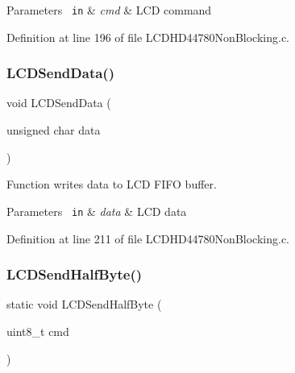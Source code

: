\begin{DoxyParams}[1]{Parameters}
\mbox{\texttt{ in}}  & {\em cmd} & L\+CD command \\
\hline
\end{DoxyParams}


Definition at line 196 of file L\+C\+D\+H\+D44780\+Non\+Blocking.\+c.

\mbox{\label{group___l_c_d_h_d44780_non_blocking_gacbe0b84f31cf18df2b70d509e826db3e_gacbe0b84f31cf18df2b70d509e826db3e}} 
\subsubsection{\texorpdfstring{LCDSendData()}{LCDSendData()}}
{\footnotesize\ttfamily void L\+C\+D\+Send\+Data (\begin{DoxyParamCaption}\item[{unsigned char}]{data }\end{DoxyParamCaption})}



Function writes data to L\+CD F\+I\+FO buffer. 


\begin{DoxyParams}[1]{Parameters}
\mbox{\texttt{ in}}  & {\em data} & L\+CD data \\
\hline
\end{DoxyParams}


Definition at line 211 of file L\+C\+D\+H\+D44780\+Non\+Blocking.\+c.

\mbox{\label{group___l_c_d_h_d44780_non_blocking_gaa62a47eb454afaa0aee3359692855962_gaa62a47eb454afaa0aee3359692855962}} 
\subsubsection{\texorpdfstring{LCDSendHalfByte()}{LCDSendHalfByte()}}
{\footnotesize\ttfamily static void L\+C\+D\+Send\+Half\+Byte (\begin{DoxyParamCaption}\item[{uint8\+\_\+t}]{cmd }\end{DoxyParamCaption})\hspace{0.3cm}{\ttfamily [static]}}


